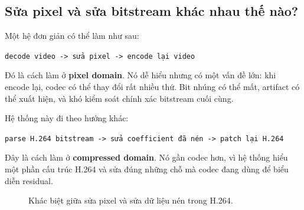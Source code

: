 \documentclass[11pt,a4paper]{article}
\begin{document}
\subsection{Sửa pixel và sửa bitstream khác nhau thế nào?}

Một hệ đơn giản có thể làm như sau:

\begin{center}
\texttt{decode video -> sửa pixel -> encode lại video}
\end{center}

Đó là cách làm ở \textbf{pixel domain}. Nó dễ hiểu nhưng có một vấn đề lớn:
khi encode lại, codec có thể thay đổi rất nhiều thứ. Bit nhúng có thể mất,
artifact có thể xuất hiện, và khó kiểm soát chính xác bitstream cuối cùng.

Hệ thống này đi theo hướng khác:

\begin{center}
\texttt{parse H.264 bitstream -> sửa coefficient đã nén -> patch lại H.264}
\end{center}

Đây là cách làm ở \textbf{compressed domain}. Nó gần codec hơn, vì hệ thống
hiểu một phần cấu trúc H.264 và sửa đúng những chỗ mà codec đang dùng để biểu
diễn residual.

\begin{figure}[H]
\centering
{}
\caption{Khác biệt giữa sửa pixel và sửa dữ liệu nén trong H.264.}
\label{fig:pixel-vs-compressed}
\end{figure}
\end{document}

